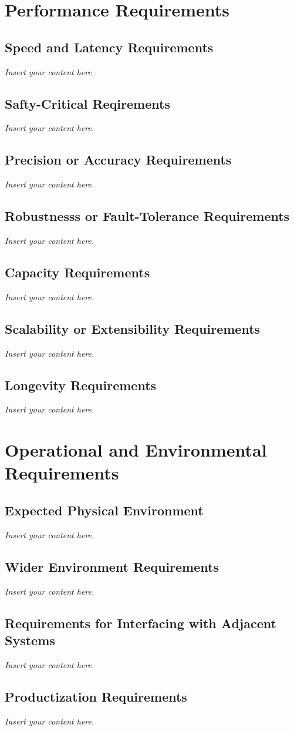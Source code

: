\documentclass[a4paper, 12pt,twoside]{article}
\newcommand{\lips}{\textit{Insert your content here.}}
\begin{document}
\section{Performance Requirements}
\subsection{Speed and Latency Requirements}
\lips
\subsection{Safty-Critical Reqirements}
\lips
\subsection{Precision or Accuracy Requirements}
\lips
\subsection{Robustnesss or Fault-Tolerance Requirements}
\lips
\subsection{Capacity Requirements}
\lips
\subsection{Scalability or Extensibility Requirements}
\lips
\subsection{Longevity Requirements}
\lips

\section{Operational and Environmental Requirements}
\subsection{Expected Physical Environment}
\lips
\subsection{Wider Environment Requirements}
\lips
\subsection{Requirements for Interfacing with Adjacent Systems}
\lips
\subsection{Productization Requirements}
\lips
\end{document}
